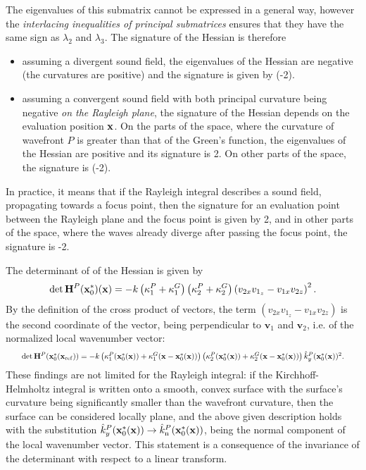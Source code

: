 The eigenvalues of this submatrix cannot be expressed in a general way, however the \emph{interlacing inequalities of principal submatrices}
ensures that they have the same sign as $\lambda_2$ and $\lambda_3$.
The signature of the Hessian is therefore 
\begin{itemize}
\item assuming a divergent sound field, the eigenvalues of the Hessian are negative (the curvatures are positive) and the signature is given by (-2).
\item assuming a convergent sound field with both principal curvature being negative \emph{on the Rayleigh plane}, the signature of the Hessian depends on the evaluation position $\mathbf{x}$.
On the parts of the space, where the curvature of wavefront $P$ is greater than that of the Green's function, the eigenvalues of the Hessian are positive and its signature is 2.
On other parts of the space, the signature is (-2).
\end{itemize}
In practice, it means that if the Rayleigh integral describes a sound field, propagating towards a focus point, then the signature for an evaluation point between the Rayleigh plane and the focus point is given by 2, and in other parts of the space, where the waves already diverge after passing the focus point, the signature is -2.

The determinant of of the Hessian is given by
\begin{equation}
\mathrm{det} \, \mathbf{H}^P(\mathbf{x}_0^*)(\mathbf{x})  = -k \left( \kappa_1^P+\kappa_1^G \right) \left( \kappa_2^P+\kappa_2^G \right) \left( v_{2 x} v_{1_z} - v_{1 x} v_{2 z} \right)^2.
\end{equation}
By the definition of the cross product of vectors, the term $\left( v_{2 x} v_{1_z} - v_{1 x} v_{2 z} \right)$ is the second coordinate of the vector, being perpendicular to $\mathbf{v}_1$ and $\mathbf{v}_2$, i.e. of the normalized local wavenumber vector:
\begin{equation}
\resizebox{.95\hsize}{!}{$
\mathrm{det} \, \mH^P(\vxo^*(\vxref))  = -k \left( \kappa_1^P(\vxo^*(\vx))+\kappa_1^G(\vx-\vxo^*(\vx)) \right) \left( \kappa_2^P(\vxo^*(\vx))+\kappa_2^G(\vx-\vxo^*(\vx)) \right) \hat{k}_y^P(\vxo^*(\vx))^2. $}
\end{equation}
These findings are not limited for the Rayleigh integral: if the Kirchhoff-Helmholtz integral is written onto a smooth, convex surface with the surface's curvature being significantly smaller than the wavefront curvature, then the surface can be considered locally plane, and the above given description holds with the substitution $\hat{k}_y^P(\mathbf{x}_0^*(\mathbf{x})) \rightarrow \hat{k}_{\mathrm{n}}^P(\mathbf{x}_0^*(\mathbf{x}))$, being the normal component of the local wavenumber vector.
This statement is a consequence of the invariance of the determinant with respect to a linear transform.
	
